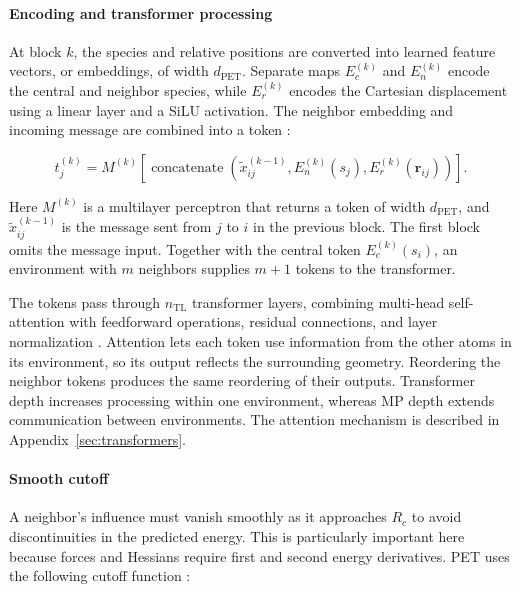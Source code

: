 \documentclass[12pt,a4paper]{article}
\numberwithin{equation}{section}
\begin{document}
\paragraph{Encoding and transformer processing}

At block $k$, the species and relative positions are converted into learned
feature vectors, or embeddings, of width $d_{\mathrm{PET}}$. Separate maps
$E_c^{(k)}$ and $E_n^{(k)}$ encode the central and neighbor species, while
$E_r^{(k)}$ encodes the Cartesian displacement using a linear layer and a
SiLU activation. The neighbor embedding and incoming message are combined
into a token \cite[Appendix~A]{pet}:

\begin{equation}
  t_j^{(k)}=M^{(k)}\!\left[
    \operatorname{concatenate}\!\left(
      \tilde x_{ij}^{(k-1)},E_n^{(k)}(s_j),
      E_r^{(k)}(\bm r_{ij})\right)\right].
  \label{eq:pet-token}
\end{equation}

Here $M^{(k)}$ is a multilayer perceptron that returns a token of width
$d_{\mathrm{PET}}$, and $\tilde x_{ij}^{(k-1)}$ is the message sent from
$j$ to $i$ in the previous block. The first block omits the message input.
Together with the central token $E_c^{(k)}(s_i)$, an environment with $m$
neighbors supplies $m+1$ tokens to the transformer.

The tokens pass through $n_{\mathrm{TL}}$ transformer layers, combining
multi-head self-attention with feedforward operations, residual connections,
and layer normalization \cite{vaswani2017}. Attention lets each token use
information from the other atoms in its environment, so its output reflects
the surrounding geometry. Reordering the neighbor tokens produces the same
reordering of their outputs. Transformer depth increases processing within
one environment, whereas MP depth extends communication between environments.
The attention mechanism is described in Appendix~\ref{sec:transformers}.

\paragraph{Smooth cutoff}

A neighbor's influence must vanish smoothly as it approaches $R_c$ to avoid
discontinuities in the predicted energy. This is particularly important
here because forces and Hessians require first and second energy derivatives.
PET uses the following cutoff function \cite[Appendix~F.1]{pet}:
\end{document}
